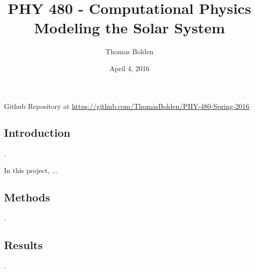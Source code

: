 \documentclass[11pt]{article}
\title{PHY 480 - Computational Physics \\ Modeling the Solar System}
\author{Thomas Bolden}
\date{April 4, 2016}
\begin{document}
\maketitle

\thispagestyle{empty}

\centerline{Github Repository at \href{https://github.com/ThomasBolden/PHY-480-Spring-2016}{https://github.com/ThomasBolden/PHY-480-Spring-2016}}

\begin{abstract}

    \lipsum[1-1]

\end{abstract}

\vfill

\tableofcontents

\vspace{3cm}

\pagebreak

\subsection{Introduction}

    . 

    In this project, ...

\subsection{Methods}


    . 

\subsection{Results}

    .

\end{document}

